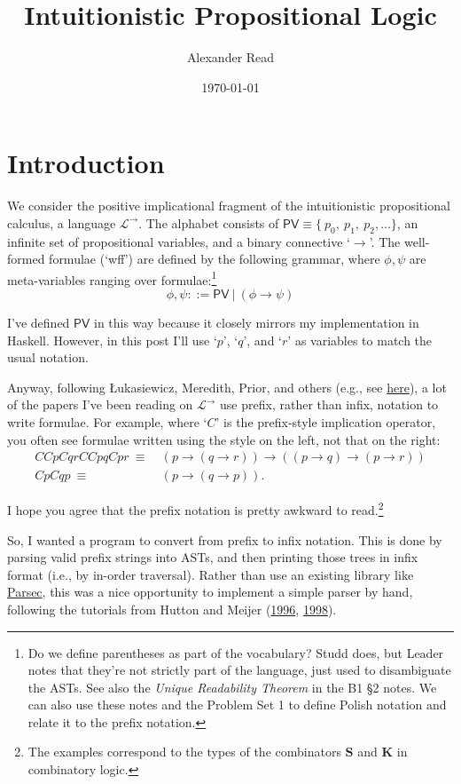 \documentclass{custom_article}
\title{Intuitionistic Propositional Logic}
\author{Alexander Read}
\date{\today}
\begin{document}
\maketitle

\section*{Introduction}

We consider the positive implicational fragment of the intuitionistic propositional calculus, a language $\mathcal{L}^{\to}$. The alphabet consists of $\textsf{PV} \equiv \{\ p_{0}, \ p_{1}, \ p_{2}, \dots \}$, an infinite set of propositional variables, and a binary connective `${\to}$'. The well-formed formulae (`wff') are defined by the following grammar, where ${\phi},{\psi}$ are meta-variables ranging over formulae:\footnote{Do we define parentheses as part of the vocabulary? Studd does, but Leader notes that they're not strictly part of the language, just used to disambiguate the ASTs. See also the \emph{Unique Readability Theorem} in the B1 §2 notes. We can also use these notes and the Problem Set 1 to define Polish notation and relate it to the prefix notation.}
%
\[
    {\phi},{\psi} ::= \textsf{PV}\ \vert\ ({\phi} \to {\psi})
\]

\noindent I've defined $\textsf{PV}$ in this way because it closely mirrors my implementation in Haskell. However, in this post I'll use `$p$', `$q$', and `$r$' as variables to match the usual notation.

Anyway, following \L ukasiewicz, Meredith, Prior, and others (e.g., see
\href{https://link.springer.com/chapter/10.1007/978-94-010-9614-0_17}{here}),
a lot of the papers I've been reading on $\mathcal{L}^{\to}$ use prefix, rather
than infix, notation to write formulae. For example, where `$C$' is the
prefix-style implication operator, you often see formulae written using the
style on the left, not that on the right:
%
\begin{align}
    CCpCqrCCpqCpr\ {\equiv}\ &(p \to (q \to r)) \to ((p \to q) \to (p \to r)) \tag{S} \\
    CpCqp\ {\equiv}\         &(p \to (q \to p)). \tag{K}
\end{align}

\noindent I hope you agree that the prefix notation is pretty awkward to read.\footnote{The examples correspond to the types of the combinators $\mathsf{\mathbf{S}}$ and $\mathsf{\mathbf{K}}$ in combinatory logic.}

So, I wanted a program to convert from prefix to infix notation. This is done
by parsing valid prefix strings into ASTs, and then printing those trees in
infix format (i.e., by in-order traversal). Rather than use an existing library
like \href{https://hackage.haskell.org/package/parsec}{Parsec}, this was a nice
opportunity to implement a simple parser by hand, following the tutorials from
Hutton and Meijer
(\href{https://www.cs.nott.ac.uk/~pszgmh/monparsing.pdf}{1996},
\href{https://www.cambridge.org/core/journals/journal-of-functional-programming/article/monadic-parsing-in-haskell/E557DFCCE00E0D4B6ED02F3FB0466093}{1998}).
\end{document}

